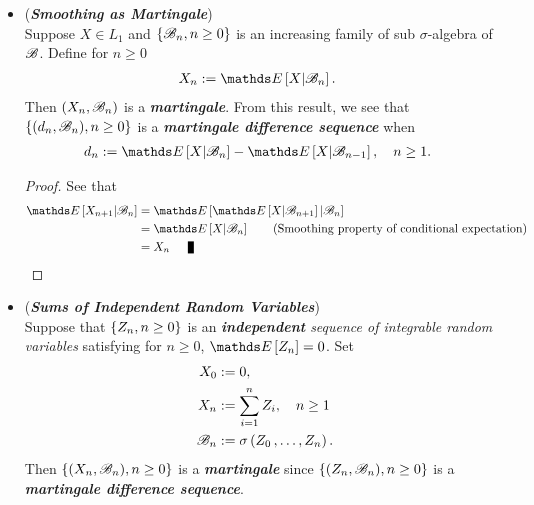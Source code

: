 \documentclass[11pt]{article}
\begin{document}
\begin{itemize}
\item \begin{example} (\textbf{\emph{Smoothing as Martingale}})\\
Suppose $X \in L_1$ and $\left\{{\mathscr B}_n, n \ge 0\right\}$ is an increasing family of sub $\sigma$-algebra of ${\mathscr B}$. Define for $n \ge 0$
\begin{align*}
X_n &:= \E{}{X | \srB_n}.
\end{align*}
Then $(X_n, {\mathscr B}_n)$ is a \emph{\textbf{martingale}}. From this result, we see that $\left\{(d_n, {\mathscr B}_n), n \ge 0\right\}$ is a \emph{\textbf{martingale difference sequence}} when 
\begin{align}
d_n &:= \E{}{X | \srB_n} - \E{}{X | \srB_{n-1}}, \quad n\ge 1. \label{eqn: smoothing_martingale_difference}
\end{align}
\end{example}
\begin{proof}
See that 
\begin{align*}
\E{}{X_{n+1} | \srB_{n}} &= \E{}{ \E{}{X | \srB_{n+1}} | \srB_n} \\
&= \E{}{X | \srB_{n}}  \qquad \text{(Smoothing property of conditional expectation)}\\
&= X_n \qed
\end{align*} 
\end{proof}

\item \begin{example}(\emph{\textbf{Sums of Independent Random Variables}}) \\
Suppose that $\left\{Z_n, n \ge 0\right\}$ is an \emph{\textbf{independent} sequence of integrable random variables} satisfying for $n \ge 0$, 
$\E{}{Z_n} = 0$.  Set
\begin{align*}
X_0 &:= 0,\\
X_n &:= \sum_{i=1}^{n}Z_i, \quad n \ge 1 \\
{\mathscr B}_n &:= \sigma\left(Z_0 \,{,}\ldots{,}\, Z_n\right).
\end{align*} Then $\left\{(X_n, {\mathscr B}_n), n \ge 0\right\}$ is a \emph{\textbf{martingale}} since $\left\{(Z_n, {\mathscr B}_n), n \ge 0\right\}$ is a \emph{\textbf{martingale difference sequence}}.
\end{example}



\end{itemize}
\end{document}
